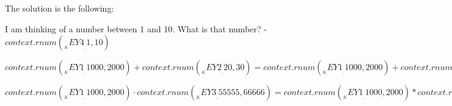 \begin{Solution}
The solution is the following:
\item I am thinking of a number between 1 and 10. What is that number? - ${{context.rnum(__KEY4__, 1, 10)}}$  
\item ${{context.rnum(__KEY1__, 1000, 2000)}} + {{context.rnum(__KEY2__, 20, 30)}} = {{context.rnum(__KEY1__, 1000, 2000) + context.rnum(__KEY2__, 20, 30)}}$ 
\item ${{context.rnum(__KEY1__, 1000, 2000)}} \cdot {{context.rnum(__KEY3__, 55555, 66666)}} = {{context.rnum(__KEY1__, 1000, 2000) * context.rnum(__KEY3__, 55555, 66666)}}$ 
\end{Solution}